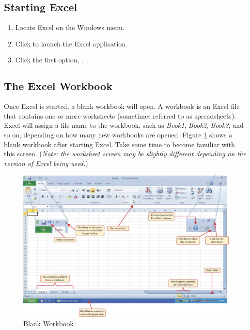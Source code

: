 \subsection{Starting Excel}

\begin{enumbox}
	\begin{enumerate}
		\item Locate Excel on the Windows menu.
		\item Click  to launch the Excel application.
		\item Click the first option, .
	\end{enumerate}
\end{enumbox}

\subsection{The Excel Workbook}

Once Excel is started, a blank workbook will open. A workbook is an Excel file that contains one or more worksheets (sometimes referred to as spreadsheets). Excel will assign a file name to the workbook, such as \textit{Book1}, \textit{Book2}, \textit{Book3}, and so on, depending on how many new workbooks are opened. Figure \ref{01:fig02} shows a blank workbook after starting Excel. Take some time to become familiar with this screen. (\textit{Note: the worksheet screen may be slightly different depending on the version of Excel being used.})

\begin{figure}[H]
	\centering
	\includegraphics[width=\maxwidth{.95\linewidth}]{gfx/ch01_fig02}
	\caption{Blank Workbook}
	\label{01:fig02}
\end{figure}

